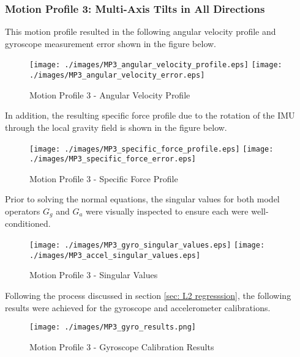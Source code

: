 \subsubsection{Motion Profile 3: Multi-Axis Tilts in All Directions}

This motion profile resulted in the following angular velocity profile and gyroscope measurement error shown in the figure below. 

\begin{figure}[!h] 
	\centering
	\texttt{[image: ./images/MP3\_angular\_velocity\_profile.eps]} \hfill
	\texttt{[image: ./images/MP3\_angular\_velocity\_error.eps]}
	\caption{Motion Profile 3 - Angular Velocity Profile}
	\label{fig: MP3 angular velocity profile}
\end{figure}
\FloatBarrier

In addition, the resulting specific force profile due to the rotation of the IMU through the local gravity field is shown in the figure below. 

\begin{figure}[!h] 
	\centering
	\texttt{[image: ./images/MP3\_specific\_force\_profile.eps]} \hfill
	\texttt{[image: ./images/MP3\_specific\_force\_error.eps]}
	\caption{Motion Profile 3 - Specific Force Profile}
	\label{fig: MP3 specific force profile}
\end{figure}
\FloatBarrier

Prior to solving the normal equations, the singular values for both model operators $G_g$ and $G_a$ were visually inspected to ensure each were well-conditioned. 

\begin{figure}[!h] 
	\centering
	\texttt{[image: ./images/MP3\_gyro\_singular\_values.eps]} \hfill
	\texttt{[image: ./images/MP3\_accel\_singular\_values.eps]}
	\caption{Motion Profile 3 - Singular Values}
	\label{fig: MP3 singular values}
\end{figure}
\FloatBarrier

Following the process discussed in section \ref{sec: L2 regresssion}, the following results were achieved for the gyroscope and accelerometer calibrations. 

\begin{figure}[h] 
	\centering
	\texttt{[image: ./images/MP3\_gyro\_results.png]}
	\caption{Motion Profile 3 - Gyroscope Calibration Results}
	\label{fig: MP3 gyro results}
\end{figure}
\FloatBarrier

